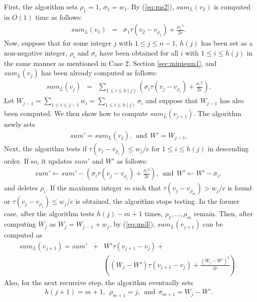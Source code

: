 \documentclass[a4paper]{llncs}
\begin{document}
First, the algorithm sets $\rho_1 = 1$, $\sigma_1 = w_1$.
By (\ref{eq:ms2}), $sum_L(v_2)$ is computed in $O(1)$ time as follows:
\begin{eqnarray}
sum_L(v_1)	&=&	 \sigma_1\tau(v_2-v_{\rho_1}) + \frac{{\sigma_1}^2}{2c}. \label{eq:ms6}
\end{eqnarray}
Now, suppose that for some integer $j$ with $1 \le j \le n-1$, $h(j)$ has been set as a non-negative integer,
$\rho_i$ and $\sigma_i$ have been obtained for all $i$ with $1 \le i \le h(j)$ in the same manner as mentioned in Case 2, Section \ref{sec:minisum1},
and $sum_L(v_j)$ has been already computed as follows:
\begin{eqnarray}
sum_L(v_j)  	&=& \sum_{1 \le i \le h(j)} \left( \sigma_i\tau(v_j-v_{\rho_i}) + \frac{{\sigma_i}^2}{2c} \right). \label{eq:ms7}
\end{eqnarray}
Let $W_{j-1} = \sum_{1 \le i \le j-1} w_i = \sum_{1 \le i \le h(j)} \sigma_i$ and suppose that $W_{j-1}$ has also been computed.
We then show how to compute $sum_L(v_{j+1})$.
The algorithm newly sets 
\begin{eqnarray}
sum' = sum_L(v_j), \ \ \mbox{and} \ \ W' = W_{j-1}.
\end{eqnarray}
Next, the algorithm tests if $\tau(v_j-v_{\rho_i}) \le w_j/c$ for $1 \le i \le h(j)$ in descending order.
If so, it updates $sum'$ and $W'$ as follows:
\begin{eqnarray}
sum'	\leftarrow sum' - \left( \sigma_i\tau(v_j-v_{\rho_i}) + \frac{{\sigma_i}^2}{2c} \right), \ \ \mbox{and} \ \ W' \leftarrow W' - \sigma_i,
\end{eqnarray}
and deletes $\rho_i$.
If the maximum integer $m$ such that $\tau(v_j-v_{\rho_m}) > w_j/c$ is found or $\tau(v_j-v_{\rho_1}) \le w_j/c$ is obtained, the algorithm stops testing.
In the former case, after the algorithm tests $h(j)-m+1$ times, $\rho_1, \ldots, \rho_{m}$ remain.
Then, after computing $W_j$ as $W_j = W_{j-1} + w_j$,
by (\ref{eq:ms3}), $sum_L(v_{j+1})$ can be computed as
\begin{eqnarray}
sum_L(v_{j+1})	= sum' &+& W'\tau(v_{j+1}-v_j) + \nonumber \\
				&  & \left( (W_j - W')\tau(v_{j+1}-v_j) + \frac{(W_j - W')^2}{2c} \right).
\end{eqnarray}
Also, for the next recursive step, the algorithm eventually sets 
\begin{eqnarray}
h(j+1)=m+1, \ \ \rho_{m+1} = j, \ \ \mbox{and} \ \ \sigma_{m+1} = W_j - W'.
\end{eqnarray}
\end{document}
